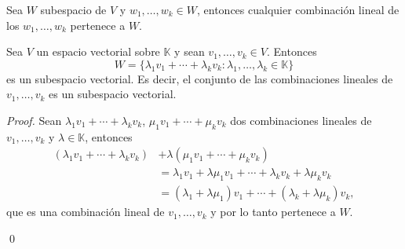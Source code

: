\documentclass[handout]{beamer} %
\newcommand{\K}{\mathbb K}
\begin{document}
    \begin{frame}
        \begin{proposicion}
            Sea $W$ subespacio de $V$ y $w_1,\ldots,w_k \in W$,  entonces cualquier combinación lineal de los $w_1,\ldots,w_k$ pertenece a $W$.
        \end{proposicion}  \pause

              
    \end{frame}
    
                             
        

    \begin{frame}
    
	\begin{teorema}
        Sea $V$ un espacio vectorial sobre $\K$ y sean $v_1,\ldots,v_k \in V$. Entonces
        $$
        W = \{\lambda_1v_1+\cdots+\lambda_kv_k: \lambda_1,\ldots,\lambda_k \in \K \}
        $$
        es un subespacio vectorial. Es decir,  el conjunto de las combinaciones lineales de $v_1,\ldots,v_k$ es un subespacio vectorial.
        \end{teorema}  \pause
        \begin{proof}  \pause
                 Sean $\lambda_1v_1+\cdots+\lambda_kv_k$, $\mu_1v_1+\cdots+\mu_kv_k$ dos combinaciones lineales de $v_1,\ldots,v_k$ y $\lambda \in \K$, entonces 
                \begin{align*}
                    (\lambda_1v_1+\cdots+\lambda_kv_k)&+\lambda (\mu_1v_1+\cdots+\mu_kv_k) \\&=  \lambda_1v_1+\lambda\mu_1v_1+\cdots+\lambda_kv_k+\lambda\mu_kv_k\\
                    &= (\lambda_1+\lambda\mu_1)v_1+\cdots+(\lambda_k+\lambda\mu_k)v_k,
                \end{align*}
                que es  una combinación lineal de  $v_1,\ldots,v_k$ y por lo tanto pertenece a $W$. 
                
                \qed
        \end{proof}
        
    \end{frame}
    
\end{document}
